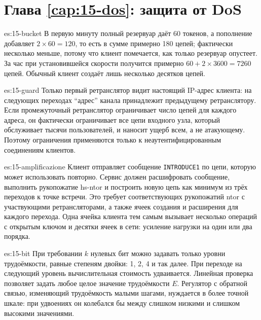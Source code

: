 \section*{Глава \ref{cap:15-dos}: защита от DoS}

\begin{soluzione}{es:15-bucket}
В первую минуту полный резервуар даёт 60 токенов, а пополнение добавляет $2 \times 60 = 120$, то есть в сумме примерно 180 цепей; фактически несколько меньше, потому что клиент помечается, как только резервуар опустеет. За час при установившейся скорости получится примерно $60 + 2 \times 3600 = 7260$ цепей. Обычный клиент создаёт лишь несколько десятков цепей.
\end{soluzione}

\begin{soluzione}{es:15-guard}
Только первый ретранслятор видит настоящий IP-адрес клиента: на следующих переходах \enquote{адрес} канала принадлежит предыдущему ретранслятору. Если промежуточный ретранслятор ограничивает число цепей для каждого адреса, он фактически ограничивает все цепи входного узла, который обслуживает тысячи пользователей, и наносит ущерб всем, а не атакующему. Поэтому ограничения применяются только к неаутентифицированным соединениям клиентов.
\end{soluzione}

\begin{soluzione}{es:15-amplificazione}
Клиент отправляет сообщение \texttt{INTRODUCE1} по цепи, которую может использовать повторно. Сервис должен расшифровать сообщение, выполнить рукопожатие hs-ntor и построить новую цепь как минимум из трёх переходов к точке встречи. Это требует соответствующих рукопожатий ntor с участвующими ретрансляторами, а также ячеек создания и расширения для каждого перехода. Одна ячейка клиента тем самым вызывает несколько операций с открытым ключом и десятки ячеек в сети: усиление нагрузки на один или два порядка.
\end{soluzione}

\begin{soluzione}{es:15-bit}
При требовании $k$ нулевых бит можно задавать только уровни трудоёмкости, равные степеням двойки: 1, 2, 4 и так далее. При переходе на следующий уровень вычислительная стоимость удваивается. Линейная проверка позволяет задать любое целое значение трудоёмкости $E$. Регулятор с обратной связью, изменяющий трудоёмкость малыми шагами, нуждается в более точной шкале: при удвоениях он колебался бы между слишком низкими и слишком высокими значениями.
\end{soluzione}

